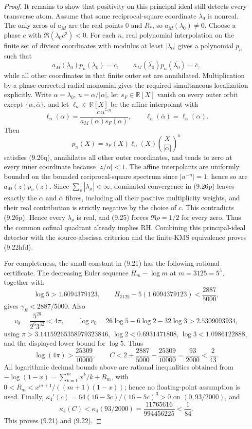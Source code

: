 \documentclass[11pt]{article}
\begin{document}
\begin{proof}
It remains to show that positivity on this principal ideal still detects every transverse atom.
Assume that some reciprocal-square coordinate $\lambda_0$ is nonreal.  The only zeros of $a_M$
are the real points $0$ and $R_*$, so $a_M(\lambda_0)\ne0$.  Choose a phase $c$ with
$\Re(\lambda_0c^2)<0$.  For each $n$, real polynomial interpolation on the finite set of divisor
coordinates with modulus at least $|\lambda_0|$ gives a polynomial $p_n$ such that
\[
 a_M(\lambda_0)p_n(\lambda_0)=c,\qquad
 a_M(\overline{\lambda_0})p_n(\overline{\lambda_0})=\overline c,
 \tag{9.26q}
\]
while all other coordinates in that finite outer set are annihilated.  Multiplication by a
phase-corrected radial monomial gives the required simultaneous localization explicitly.  Write
$\alpha=\lambda_0$, $u=\alpha/|\alpha|$, let $s_F\in\mathbb R[X]$ vanish on every outer orbit
except $\{\alpha,\overline\alpha\}$, and let $\ell_n\in\mathbb R[X]$ be the affine interpolant
with
\[
 \ell_n(\alpha)=
 \frac{c\,u^{-n}}{a_M(\alpha)s_F(\alpha)},\qquad
 \ell_n(\overline\alpha)=\overline{\ell_n(\alpha)}.
\]
Then
\[
 p_n(X)=s_F(X)\ell_n(X)\left(\frac{X}{|\alpha|}\right)^n
 \tag{9.26r}
\]
satisfies \textup{(9.26q)}, annihilates all other outer coordinates, and tends to zero at every
inner coordinate because $|z/\alpha|<1$.  The affine interpolants are uniformly bounded on the
bounded reciprocal-square spectrum since $|u^{-n}|=1$; hence so are
$a_M(z)p_n(z)$.  Since $\sum_\rho|\lambda_\rho|<\infty$, dominated convergence in
\textup{(9.26p)} leaves exactly the $\alpha$ and $\overline\alpha$ fibres, including all their
positive multiplicity weights, and their real contribution is strictly negative by the choice
of $c$.  This contradicts \textup{(9.26p)}.  Hence every $\lambda_\rho$ is real, and
\textup{(9.25)} forces $\Re\rho=1/2$ for every zero.  Thus the common cofinal quadrant already
implies RH.  Combining this principal-ideal detector with the source-abscissa criterion and the
finite-KMS equivalence proves \textup{(9.22hfd)}.

For completeness, the small constant in \textup{(9.21)} has the following rational certificate.
The decreasing Euler sequence $H_m-\log m$ at $m=3125=5^5$, together with
\[
 \log5>1.6094379123,\qquad
 H_{3125}-5(1.6094379123)<\frac{2887}{5000},
\]
gives $\gamma_{\!E}<2887/5000$.  Also
\[
 v_0=\frac{5^{26}}{2^6 3^{32}}<4\pi,\qquad
 \log v_0=26\log5-6\log2-32\log3>2.5309093934,
\]
using $\pi>3.14159265358979323846$, $\log2<0.6931471808$,
$\log3<1.0986122888$, and the displayed lower bound for $\log5$.  Thus
\[
 \log(4\pi)>\frac{25309}{10000},\qquad
 C<2+\frac{2887}{5000}-\frac{25309}{10000}
 =\frac{93}{2000}<\frac2{43}.
 \tag{9.27}
\]
All logarithmic decimal bounds above are rational inequalities obtained from
$-\log(1-x)=\sum_{k=1}^m x^k/k+R_m$, with
$0<R_m<x^{m+1}/((m+1)(1-x))$; hence no floating-point assumption is used.  Finally,
$\kappa_4'(c)=64(16-3c)/(16-5c)^3>0$ on $(0,93/2000)$, and
\[
 \kappa_4(C)<\kappa_4(93/2000)
 =\frac{11765616}{994456225}<\frac1{84}.
\]
This proves \textup{(9.21)} and \textup{(9.22)}.


\end{proof}
\end{document}
